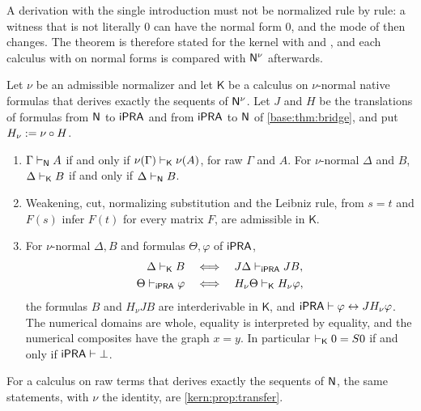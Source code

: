 A derivation with the single introduction must not be normalized rule by
rule: a witness that is not literally $0$ can have the normal form $0$, and
the mode of  then changes. The theorem is therefore stated for
the kernel with  and , and each calculus with
 on normal forms is compared with $\mathsf{N}^{\nu}$ afterwards.

\begin{corollary}
\label{comp:cor:bridge}
Let $\nu$ be an admissible normalizer and let $\mathsf{K}$ be a calculus on
$\nu$-normal native formulas that derives exactly the sequents of
$\mathsf{N}^{\nu}$. Let $J$ and $H$ be the translations of formulas from $\mathsf{N}$ to
$\mathsf{iPRA}$ and from $\mathsf{iPRA}$ to $\mathsf{N}$ of \cref{base:thm:bridge}, and put
$H_{\nu}\mathrel{:=}\nu\circ H$.
\begin{enumerate}[label=(\alph*)]
\item $\Gamma\vdash_{\mathsf{N}}A$ if and only if
 $\nu(\Gamma)\vdash_{\mathsf K}\nu(A)$, for raw $\Gamma$ and $A$. For
 $\nu$-normal $\Delta$ and $B$, $\Delta\vdash_{\mathsf K}B$ if and only if
 $\Delta\vdash_{\mathsf{N}}B$.
\item Weakening, cut, normalizing substitution and the Leibniz rule, from
 $s=t$ and $F(s)$ infer $F(t)$ for every matrix $F$, are admissible in
 $\mathsf{K}$.
\item For $\nu$-normal $\Delta,B$ and formulas $\Theta,\varphi$ of $\mathsf{iPRA}$,
 \begin{align*}
  \Delta\vdash_{\mathsf K}B
   &\quad\Longleftrightarrow\quad J\Delta\vdash_{\mathsf{iPRA}}JB,\\
  \Theta\vdash_{\mathsf{iPRA}}\varphi
   &\quad\Longleftrightarrow\quad
   H_{\nu}\Theta\vdash_{\mathsf K}H_{\nu}\varphi,
 \end{align*}
 the formulas $B$ and $H_{\nu}JB$ are interderivable in $\mathsf{K}$, and
 $\mathsf{iPRA}\vdash\varphi\leftrightarrow JH_{\nu}\varphi$. The numerical
 domains are whole, equality is interpreted by equality, and the numerical
 composites have the graph $x=y$. In particular
 $\vdash_{\mathsf K}0=S0$ if and only if $\mathsf{iPRA}\vdash\bot$.
\end{enumerate}
For a calculus on raw terms that derives exactly the sequents of $\mathsf{N}$,
the same statements, with $\nu$ the identity, are
\cref{kern:prop:transfer}.
\end{corollary}

